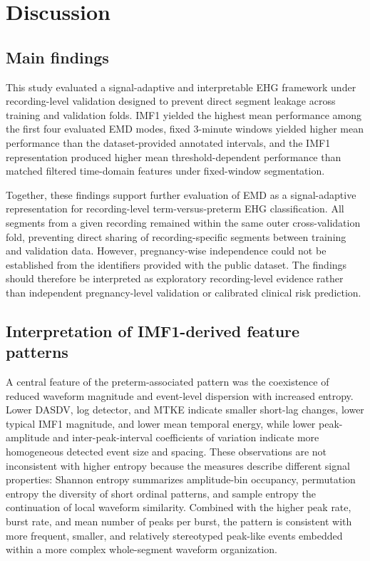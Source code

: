 \documentclass[10pt,letterpaper]{article}
\begin{document}
\section*{Discussion}

\subsection*{Main findings}
This study evaluated a signal-adaptive and interpretable EHG framework under recording-level validation designed to prevent direct segment leakage across training and validation folds. IMF1 yielded the highest mean performance among the first four evaluated EMD modes, fixed 3-minute windows yielded higher mean performance than the dataset-provided annotated intervals, and the IMF1 representation produced higher mean threshold-dependent performance than matched filtered time-domain features under fixed-window segmentation. 

Together, these findings support further evaluation of EMD as a signal-adaptive representation for recording-level term-versus-preterm EHG classification. All segments from a given recording remained within the same outer cross-validation fold, preventing direct sharing of recording-specific segments between training and validation data. However, pregnancy-wise independence could not be established from the identifiers provided with the public dataset. The findings should therefore be interpreted as exploratory recording-level evidence rather than independent pregnancy-level validation or calibrated clinical risk prediction.

\subsection*{Interpretation of IMF1-derived feature patterns}
A central feature of the preterm-associated pattern was the coexistence of reduced waveform magnitude and event-level dispersion with increased entropy. Lower DASDV, log detector, and MTKE indicate smaller short-lag changes, lower typical IMF1 magnitude, and lower mean temporal energy, while lower peak-amplitude and inter-peak-interval coefficients of variation indicate more homogeneous detected event size and spacing. These observations are not inconsistent with higher entropy because the measures describe different signal properties: Shannon entropy summarizes amplitude-bin occupancy, permutation entropy the diversity of short ordinal patterns, and sample entropy the continuation of local waveform similarity. Combined with the higher peak rate, burst rate, and mean number of peaks per burst, the pattern is consistent with more frequent, smaller, and relatively stereotyped peak-like events embedded within a more complex whole-segment waveform organization.
\end{document}
